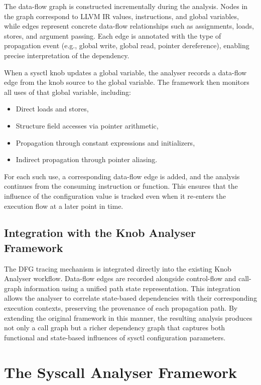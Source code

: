 The data-flow graph is constructed incrementally during the analysis.
Nodes in the graph correspond to LLVM IR values, instructions, and global variables, while edges represent concrete data-flow relationships such as assignments, loads, stores, and argument passing.
Each edge is annotated with the type of propagation event (e.g., global write, global read, pointer dereference), enabling precise interpretation of the dependency.

When a sysctl knob updates a global variable, the analyser records a data-flow edge from the knob source to the global variable.
The framework then monitors all uses of that global variable, including:
\begin{itemize}
    \item Direct loads and stores,
    \item Structure field accesses via pointer arithmetic,
    \item Propagation through constant expressions and initializers,
    \item Indirect propagation through pointer aliasing.
\end{itemize}

For each such use, a corresponding data-flow edge is added, and the analysis continues from the consuming instruction or function.
This ensures that the influence of the configuration value is tracked even when it re-enters the execution flow at a later point in time.

\subsection{Integration with the Knob Analyser Framework}

The DFG tracing mechanism is integrated directly into the existing Knob Analyser workflow.
Data-flow edges are recorded alongside control-flow and call-graph information using a unified path state representation. This integration allows the analyser to correlate state-based dependencies with their corresponding execution contexts, preserving the provenance of each propagation path.
By extending the original framework in this manner, the resulting analysis produces not only a call graph but a richer dependency graph that captures both functional and state-based influences of sysctl configuration parameters.

\section{The Syscall Analyser Framework}

